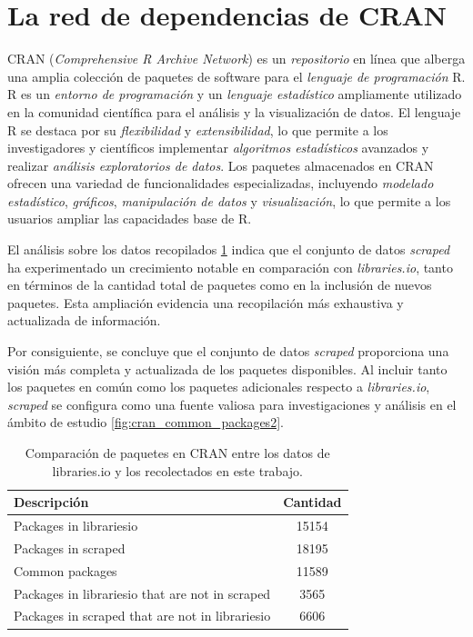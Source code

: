 

\section{La red de dependencias de CRAN}

CRAN (\textit{Comprehensive R Archive Network}) es un \textit{repositorio} en línea que alberga
una amplia colección de paquetes de software para el \textit{lenguaje de programación} R.
R es un \textit{entorno de programación} y un \textit{lenguaje estadístico} ampliamente
utilizado en la comunidad científica para el análisis y la visualización de datos.
El lenguaje R se destaca por su \textit{flexibilidad} y \textit{extensibilidad},
lo que permite a los investigadores y científicos implementar \textit{algoritmos estadísticos}
avanzados y realizar \textit{análisis exploratorios de datos}.
Los paquetes almacenados en CRAN ofrecen una variedad de funcionalidades especializadas,
incluyendo \textit{modelado estadístico}, \textit{gráficos}, \textit{manipulación de datos}
y \textit{visualización}, lo que permite a los usuarios ampliar las capacidades base de R.

El análisis sobre los datos recopilados \ref{tab:cran_common_packages} indica que el conjunto de datos \textit{scraped}
ha experimentado un crecimiento notable en comparación con \textit{libraries.io}, tanto en
términos de la cantidad total de paquetes como en la inclusión de nuevos paquetes.
Esta ampliación evidencia una recopilación más exhaustiva y actualizada de información.

Por consiguiente, se concluye que el conjunto de datos \textit{scraped} proporciona una
visión más completa y actualizada de los paquetes disponibles. Al incluir tanto los paquetes
en común como los paquetes adicionales respecto a \textit{libraries.io}, \textit{scraped}
se configura como una fuente valiosa para investigaciones y análisis en el ámbito de estudio \ref{fig:cran_common_packages2}.


\begin{table}[h!]
    \begin{tabular}{|l|c|}
        \hline
        \textbf{Descripción}                            & \textbf{Cantidad} \\
        \hline
        Packages in librariesio                         & 15154             \\
        Packages in scraped                             & 18195             \\
        Common packages                                 & 11589             \\
        Packages in librariesio that are not in scraped & 3565              \\
        Packages in scraped that are not in librariesio & 6606              \\
        \hline
    \end{tabular}
    \caption{Comparación de paquetes en CRAN entre los datos de libraries.io y los recolectados en este trabajo.}
    \label{tab:cran_common_packages}
\end{table}


